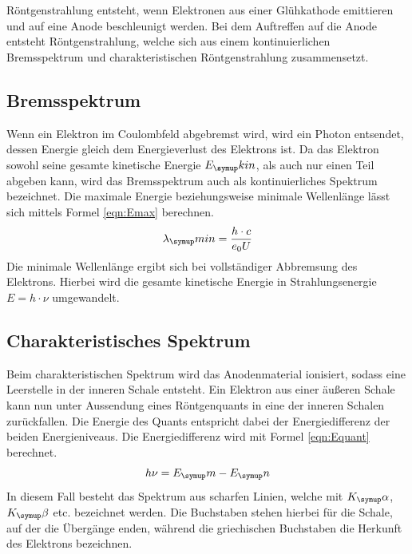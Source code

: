 Röntgenstrahlung entsteht, wenn Elektronen aus einer Glühkathode emittieren und
auf eine Anode beschleunigt werden. Bei dem Auftreffen auf die Anode entsteht
Röntgenstrahlung, welche sich aus einem kontinuierlichen Bremsspektrum und
charakteristischen Röntgenstrahlung zusammensetzt.
\subsection{Bremsspektrum}
Wenn ein Elektron im Coulombfeld abgebremst wird, wird ein Photon entsendet,
dessen Energie gleich dem Energieverlust des Elektrons ist.
Da das Elektron sowohl seine gesamte kinetische Energie $E_\su{kin}$, als auch
nur einen Teil abgeben kann, wird das Bremsspektrum auch als kontinuierliches
Spektrum bezeichnet.
Die maximale Energie beziehungsweise minimale Wellenlänge lässt sich mittels
Formel \eqref{eqn:Emax} berechnen.
\begin{equation}
  \lambda_\su{min} = \frac{h\cdot c}{e_0U}
  \label{eqn:Emax}
\end{equation}
Die minimale Wellenlänge ergibt sich bei vollständiger Abbremsung des Elektrons.
Hierbei wird die gesamte kinetische Energie in Strahlungsenergie $E=h\cdot\nu$
umgewandelt.
\subsection{Charakteristisches Spektrum}
Beim charakteristischen Spektrum wird das Anodenmaterial ionisiert, sodass
eine Leerstelle in der inneren Schale entsteht. Ein Elektron aus einer äußeren
Schale kann nun  unter Aussendung eines Röntgenquants in eine der inneren
Schalen zurückfallen. Die Energie des Quants entspricht dabei der
Energiedifferenz der beiden Energieniveaus.
Die Energiedifferenz wird mit Formel \eqref{eqn:Equant} berechnet.
\begin{equation}
  h\nu = E_\su{m}-E_\su{n}
  \label{eqn:Equant}
\end{equation}
In diesem Fall besteht das Spektrum aus scharfen Linien, welche mit $K_\su{\alpha}
$, $K_\su{\beta}$ etc. bezeichnet werden. Die Buchstaben stehen hierbei für die
Schale, auf der die Übergänge enden, während die griechischen Buchstaben die
Herkunft des Elektrons bezeichnen.

